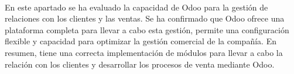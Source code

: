 \paragraph{}
En este apartado se ha evaluado la capacidad de Odoo para la gestión de relaciones con los clientes y las ventas. Se ha confirmado que Odoo ofrece una plataforma completa para llevar a cabo esta gestión, permite una configuración flexible y capacidad para optimizar la gestión comercial de la compañía. En resumen, tiene una correcta implementación de módulos para llevar a cabo la relación con los clientes y desarrollar los procesos de venta mediante Odoo. 
